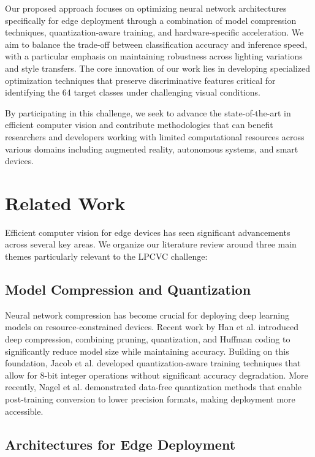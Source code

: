 \documentclass[11pt, oneside]{article}   	%
\begin{document}
Our proposed approach focuses on optimizing neural network architectures specifically for edge deployment through a combination of model compression techniques, quantization-aware training, and hardware-specific acceleration. We aim to balance the trade-off between classification accuracy and inference speed, with a particular emphasis on maintaining robustness across lighting variations and style transfers. The core innovation of our work lies in developing specialized optimization techniques that preserve discriminative features critical for identifying the 64 target classes under challenging visual conditions.

By participating in this challenge, we seek to advance the state-of-the-art in efficient computer vision and contribute methodologies that can benefit researchers and developers working with limited computational resources across various domains including augmented reality, autonomous systems, and smart devices.

\section*{Related Work}

Efficient computer vision for edge devices has seen significant advancements across several key areas. We organize our literature review around three main themes particularly relevant to the LPCVC challenge:

\subsection*{Model Compression and Quantization}

Neural network compression has become crucial for deploying deep learning models on resource-constrained devices. Recent work by Han et al. \cite{han2016deep} introduced deep compression, combining pruning, quantization, and Huffman coding to significantly reduce model size while maintaining accuracy. Building on this foundation, Jacob et al. \cite{jacob2018quantization} developed quantization-aware training techniques that allow for 8-bit integer operations without significant accuracy degradation. More recently, Nagel et al. \cite{nagel2021white} demonstrated data-free quantization methods that enable post-training conversion to lower precision formats, making deployment more accessible.

\subsection*{Architectures for Edge Deployment}
\end{document}
